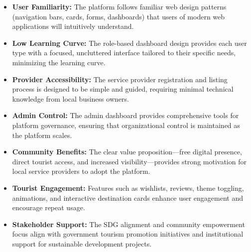 \begin{itemize}[leftmargin=2em]
    \item \textbf{User Familiarity:} The platform follows familiar web design patterns (navigation bars, cards, forms, dashboards) that users of modern web applications will intuitively understand.
    \item \textbf{Low Learning Curve:} The role-based dashboard design provides each user type with a focused, uncluttered interface tailored to their specific needs, minimizing the learning curve.
    \item \textbf{Provider Accessibility:} The service provider registration and listing process is designed to be simple and guided, requiring minimal technical knowledge from local business owners.
    \item \textbf{Admin Control:} The admin dashboard provides comprehensive tools for platform governance, ensuring that organizational control is maintained as the platform scales.
    \item \textbf{Community Benefits:} The clear value proposition---free digital presence, direct tourist access, and increased visibility---provides strong motivation for local service providers to adopt the platform.
    \item \textbf{Tourist Engagement:} Features such as wishlists, reviews, theme toggling, animations, and interactive destination cards enhance user engagement and encourage repeat usage.
    \item \textbf{Stakeholder Support:} The SDG alignment and community empowerment focus align with government tourism promotion initiatives and institutional support for sustainable development projects.
\end{itemize}
